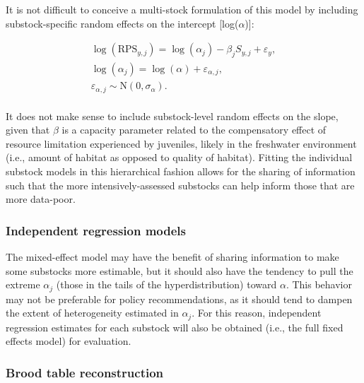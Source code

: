 \documentclass[12pt,]{book}
\theoremstyle{definition}
\theoremstyle{definition}
\theoremstyle{definition}
\theoremstyle{remark}
\begin{document}
It is not difficult to conceive a multi-stock formulation of this model
by including substock-specific random effects on the intercept
{[}log(\(\alpha\)){]}:

\begin{equation}
  \begin{split}
    \log(\text{RPS}_{y,j})=\log(\alpha_j)-\beta_j S_{y,j} + \varepsilon_y, \\
    \log(\alpha_j)=\log(\alpha) + \varepsilon_{\alpha,j}, \\
    \varepsilon_{\alpha,j} \sim \text{N}(0,\sigma_{\alpha}). \\
  \end{split}
\label{eq:lin-ricker-mixed}
\end{equation}

\noindent
It does not make sense to include substock-level random effects on the
slope, given that \(\beta\) is a capacity parameter related to the
compensatory effect of resource limitation experienced by juveniles,
likely in the freshwater environment (i.e., amount of habitat as opposed
to quality of habitat). Fitting the individual substock models in this
hierarchical fashion allows for the sharing of information such that the
more intensively-assessed substocks can help inform those that are more
data-poor.

\subsubsection{Independent regression
models}\label{independent-regression-models}

\noindent
The mixed-effect model may have the benefit of sharing information to
make some substocks more estimable, but it should also have the tendency
to pull the extreme \(\alpha_j\) (those in the tails of the
hyperdistribution) toward \(\alpha\). This behavior may not be
preferable for policy recommendations, as it should tend to dampen the
extent of heterogeneity estimated in \(\alpha_j\). For this reason,
independent regression estimates for each substock will also be obtained
(i.e., the full fixed effects model) for evaluation.

\subsubsection{Brood table reconstruction}\label{lm-btable}
\end{document}
